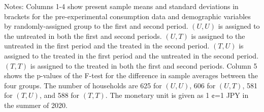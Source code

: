 \begin{table}[H]
\begin{threeparttable}
\begin{tablenotes}[flushleft]
\footnotesize\item Notes: Columns 1-4 show present sample means and standard deviations in brackets for the pre-experimental consumption data and demographic variables by randomly-assigned group to the first and second period. $(U,U)$ is assigned to the untreated in both the first and second periods. $(U,T)$ is assigned to the untreated in the first period and the treated in the second period. $(T,U)$ is assigned to the treated in the first period and the untreated in the second period. $(T,T)$ is assigned to the treated in both the first and second periods. Column 5 shows the p-values of the F-test for the difference in sample averages between the four groups. The number of households are 625 for $(U,U)$, 606 for $(U,T)$, 581 for $(T,U)$, and 588 for $(T,T)$. The monetary unit is given as 1 ¢=1 JPY in the summer of 2020.
\end{tablenotes}
\end{threeparttable}
\end{table}